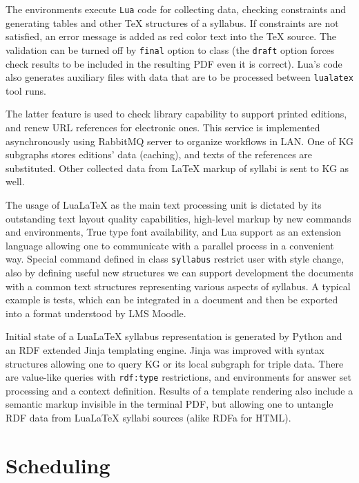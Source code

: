 \documentclass[
]{ceurart}
\providecommand{\LuaLaTeX}{Lua\LaTeX}
\begin{document}
The environments execute \verb|Lua| code for collecting data, checking constraints and generating tables and other \TeX{} structures of a syllabus.  If constraints are not satisfied, an error message is added as red color text into the \TeX{} source.   The validation can be turned off by \verb|final| option to class (the \verb|draft| option forces check results to be included in the resulting PDF even it is correct).  Lua's code also generates auxiliary files with data that are to be processed between \verb|lualatex| tool runs.

The latter feature is used to check library capability to support printed editions, and renew URL references for electronic ones.  This service is implemented asynchronously using RabbitMQ server to organize workflows in LAN.  One of KG subgraphs stores editions' data (caching), and texts of the references are substituted.  Other collected data from \LaTeX{} markup of syllabi is sent to KG as well.

The usage of \LuaLaTeX{} as the main text processing unit is dictated by its outstanding text layout quality capabilities, high-level markup by new commands and environments, True type font availability, and Lua support as an extension language allowing one to communicate with a parallel process in a convenient way.  Special command defined in class \verb|syllabus| restrict user with style change, also by defining useful new structures we can support development the documents with a common text structures representing various aspects of syllabus.  A typical example is tests, which can be integrated in a document and then be exported into a format understood by LMS Moodle.

Initial state of a \LuaLaTeX{} syllabus representation is generated by Python and an RDF extended Jinja templating engine.  Jinja was improved with syntax structures allowing one to query KG or its local subgraph for triple data.  There are value-like queries with \verb|rdf:type| restrictions, and environments for answer set processing and a context definition.  Results of a template rendering also include a semantic markup invisible in the terminal PDF, but allowing one to untangle RDF data from \LuaLaTeX{} syllabi sources (alike RDFa for HTML).


\section{Scheduling}
\end{document}
